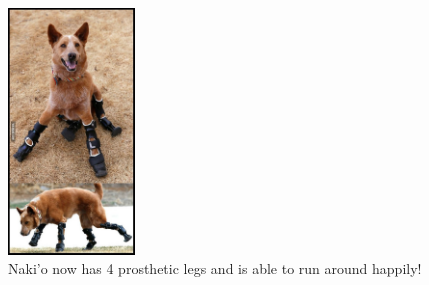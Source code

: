 \documentclass[8pt]{beamer}
\begin{document}
\begin{frame}[allowframebreaks]
	
\end{frame}
		
\begin{frame}
\begin{center}
				\begin{figure}
					\includegraphics[width=0.3\textwidth]{graphics/dog.jpg}
					\caption{Naki’o now has 4 prosthetic legs and is able to run around happily!}
				\end{figure}
			\end{center}
\end{frame}
\end{document}

